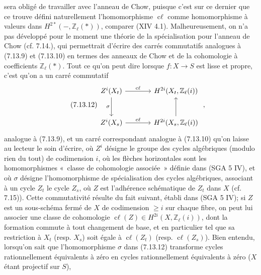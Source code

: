 
sera obligé de travailler avec l'anneau de Chow, puisque c'est sur ce dernier que ce trouve défini naturellement l'homomorphisme \(\operatorname{c\ell}\) comme homomorphisme à valeurs dans \(H^{2*}(-,\mathbb Z_\ell(*))\), comparer (XIV 4.1). Malheureusement, on n'a pas développé pour le moment une théorie de la spécialisation pour l'anneau de Chow (cf. 7.14.), qui permettrait d'écrire des carrés commutatifs analogues à (7.13.9) et (7.13.10) en termes des anneaux de Chow et de la cohomologie à coefficients \(\mathbb Z_\ell(*)\). Tout ce qu'on peut dire lorsque \(f:X\to S\) est lisse et propre, c'est qu'on a un carré commutatif
\begin{equation}\tag{7.13.12}
\begin{tikzcd}[column sep=large,row sep=large]
Z^i(X_t) \arrow[r,"\operatorname{c\ell}"] \arrow[d,"\sigma"'] &
H^{2i}(X_t,\mathbb Z_\ell(i))\\
Z^i(X_s) \arrow[r,"\operatorname{c\ell}"] &
H^{2i}(X_s,\mathbb Z_\ell(i)) \arrow[u]
\end{tikzcd}
\;,
\end{equation}
analogue à (7.13.9), et un carré correspondant analogue à (7.13.10) qu'on laisse au lecteur le soin d'écrire, où \(Z^i\) désigne le groupe des cycles algébriques (modulo rien du tout) de codimension \(i\), où les flèches horizontales sont les homomorphismes «~classe de cohomologie associée~» définie dans (SGA 5 IV), et où \(\sigma\) désigne l'homomorphisme de spécialisation des cycles algébriques, associant à un cycle \(Z_t\) le cycle \(Z_s\), où \(Z\) est l'adhérence schématique de \(Z_t\) dans \(X\) (cf. 7.15)). Cette commutativité résulte du fait suivant, établi dans (SGA 5 IV); si \(Z\) est un sous-schéma fermé de \(X\) de codimension \(\geq i\) sur chaque fibre, on peut lui associer une classe de cohomologie \(\operatorname{c\ell}(Z)\in H^{2i}(X,\mathbb Z_\ell(i))\), dont la formation commute à tout changement de base, et en particulier tel que sa restriction à \(X_t\) (resp. \(X_s\)) soit égale à \(\operatorname{c\ell}(Z_t)\) (resp. \(\operatorname{c\ell}(Z_s)\)). Bien entendu, lorsqu'on sait que l'homomorphisme \(\sigma\) dans (7.13.12) transforme cycles rationnellement équivalents à zéro en cycles rationnellement équivalents à zéro (\(X\) étant projectif sur \(S\)),
